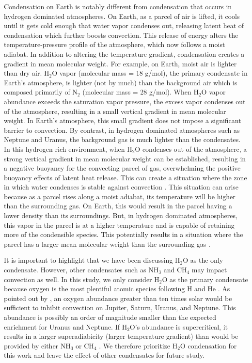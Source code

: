 \documentclass[11pt]{ucscthesisbs}
\begin{document}
Condensation on Earth is notably different from condensation that occurs in hydrogen dominated atmospheres. On Earth, as a parcel of air is lifted, it cools until it gets cold enough that water vapor condenses out, releasing latent heat of condensation which further boosts convection. This release of energy alters the temperature-pressure profile of the atmosphere, which now follows a moist adiabat.  In addition to altering the temperature gradient, condensation creates a gradient in mean molecular weight. For example, on Earth, moist air is lighter than dry air. H$_{2}$O vapor (molecular mass = 18 g/mol), the primary condensate in Earth's atmosphere, is lighter (not by much) than the background air which is composed primarily of N$_{2}$ (molecular mass = 28 g/mol). When H$_{2}$O vapor abundance exceeds the saturation vapor pressure, the excess vapor condenses out of the atmosphere, resulting in a small vertical gradient in mean molecular weight. In Earth's atmosphere, this small gradient does not impose a significant barrier to convection. By contrast, in hydrogen dominated atmospheres such as Neptune and Uranus, the background gas is much lighter than the condensates. In this hydrogen-rich environment, when H$_{2}$O condenses out of the atmosphere, a strong vertical gradient in mean molecular weight can be established, resulting in a negative buoyancy for the convecting parcel of gas, overwhelming the positive buoyancy effects of latent heat release. This can create a situation where the zone in which water condenses is stable against convection \citep{guillot_1995,friedson_2017,leconte_2017}. This situation can arise because as a parcel rises along a moist adiabat, its temperature will be higher than the surrounding gas. On Earth, this would result in the parcel having a lower density than its surroundings. But, in hydrogen dominated atmospheres, this vapor in the parcel is at a higher temperature and is capable of retaining more of the condensible species. This potentially results in a situation where the parcel has a larger mean molecular weight than the surrounding gas \citep{leconte_2017}.

It is important to highlight that we have been discussing H$_{2}$O as the only condensate. However, other condensates such as NH$_{3}$ and CH$_{4}$ may impact convection as well. In this study, we only consider H$_{2}$O as the primary condensate because oxygen is the most plentiful atomic species following H and He \citep{leconte_2017}. As pointed out by \citep{guillot_1995}, an oxygen abundance greater than ten times solar would be sufficient to inhibit convection on Jupiter, Saturn, Uranus, and Neptune. This abundance is possibly an order of magnitude smaller than the expected enrichment for Uranus and Neptune. If H$_{2}$O's abundance is supercritical, it results in a larger superadiabicity (larger temperature gradient) than would be provided by either NH$_{3}$ or CH$_{4}$ \citep{guillot_1995}. We therefore prioritize H$_{2}$O condensation for this work and leave the effect of other condensates for future study. 
\end{document}

